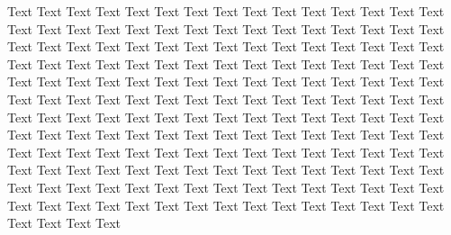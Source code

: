 \documentclass[letter]{bioinfo}
\begin{document}
Text Text Text Text Text Text  Text Text Text Text Text Text Text Text  Text Text Text Text Text Text Text Text  Text Text Text Text Text Text Text Text  Text Text Text Text Text Text Text Text  Text Text Text Text Text Text Text Text  Text Text Text Text Text Text Text Text  Text Text Text Text Text Text Text Text  Text Text Text Text Text Text Text Text  Text Text Text Text Text Text Text Text  Text Text Text Text Text Text Text Text  Text Text Text Text Text Text Text Text  Text Text Text Text Text Text Text Text  Text Text Text Text Text Text Text Text  Text Text Text Text Text Text Text Text  Text Text Text Text Text Text Text Text  Text Text Text Text Text Text Text Text  Text Text Text Text Text Text Text Text  Text Text Text Text Text Text Text Text  Text Text Text Text Text Text Text Text  Text Text Text Text Text Text Text Text  Text Text Text Text Text Text Text Text  Text Text Text Text Text Text Text Text  Text Text 
\end{document}
